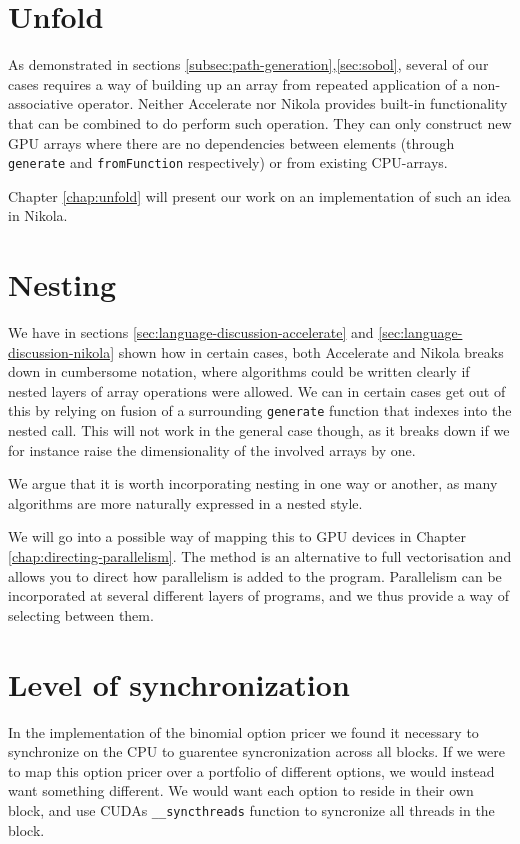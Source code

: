 \section{Unfold}

As demonstrated in sections \ref{subsec:path-generation},\ref{sec:sobol},
several of our cases requires a way of building up an array from repeated
application of a non-associative operator. Neither Accelerate nor Nikola
provides built-in functionality that can be combined to do perform such
operation. They can only construct new GPU arrays where there are no
dependencies between elements (through \lstinline{generate} and
\lstinline{fromFunction} respectively) or from existing CPU-arrays.

Chapter \ref{chap:unfold} will present our work on an implementation of such
an idea in Nikola.

\section{Nesting}

We have in sections \ref{sec:language-discussion-accelerate}
and \ref{sec:language-discussion-nikola} shown how in certain cases, both
Accelerate and Nikola breaks down in cumbersome notation, where algorithms
could be written clearly if nested layers of array operations were allowed. We
can in certain cases get out of this by relying on fusion of a surrounding
\lstinline{generate} function that indexes into the nested call. This will not
work in the general case though, as it breaks down if we for instance raise the
dimensionality of the involved arrays by one.

We argue that it is worth incorporating nesting in one way or another,
as many algorithms are more naturally expressed in a nested style.

We will go into a possible way of mapping this to GPU devices in Chapter
\ref{chap:directing-parallelism}. The method is an alternative to full
vectorisation and allows you to direct how parallelism is added to the program.
Parallelism can be incorporated at several different layers of programs, and we
thus provide a way of selecting between them.

\section{Level of synchronization}
In the implementation of the binomial option pricer we found it
necessary to synchronize on the CPU to guarentee syncronization across
all blocks. If we were to map this option pricer over a portfolio of
different options, we would instead want something different. We would
want each option to reside in their own block, and use CUDAs
\lstinline{__syncthreads} function to syncronize all threads in the
block.

